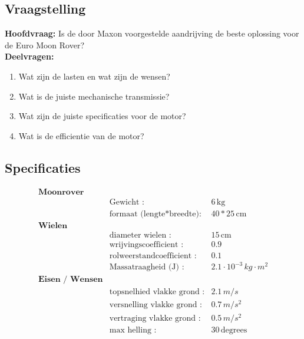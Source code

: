 \subsection{Vraagstelling}
\textbf{Hoofdvraag:}
Is de door Maxon voorgestelde aandrijving de beste oplossing voor de Euro Moon Rover?\\
\textbf{Deelvragen:}
\begin{enumerate}
    \item Wat zijn de lasten en wat zijn de wensen?
    \item Wat is de juiste mechanische transmissie?
    \item Wat zijn de juiste specificaties voor de motor?
    \item Wat is de efficientie van de motor?
\end{enumerate}

\subsection{Specificaties}
\begin{align*}
  \textbf{Moonrover}\\
  &\text{Gewicht :} & 6 \, \text{kg} \\
  &\text{formaat (lengte*breedte):} & 40*25 \, \text{cm}\\
  \textbf{Wielen}\\
  &\text{diameter wielen :} & 15 \, \text{cm}\\
  &\text{wrijvingscoefficient :} & 0.9 \, \\
  &\text{rolweerstandcoefficient :} & 0.1 \, \\
  &\text{Massatraagheid (J) :} & \text{$2.1 \cdot 10^{-3}$} \, \text{$kg \cdot m^{2}$}\\
  \textbf{Eisen / Wensen}\\
  &\text{topsnelhied vlakke grond :} & 2.1 \, \text{$m/s$}\\
  &\text{versnelling vlakke grond :} & 0.7 \, \text{$m/s^{2}$}\\
  &\text{vertraging vlakke grond :} & 0.5 \, \text{$m/s^{2}$}\\
  &\text{max helling :} & 30 \, \text{degrees}
\end{align*}